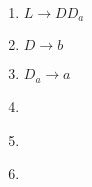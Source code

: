 \begin{tcolorbox}[colback=yellow!15!white, colframe=blue!50!white,
	fonttitle=\bfseries\Large, title = Μετατροπή $CFG\rightarrow CNF$ 2/3]
\begin{itemize}
\begin{minipage}[t]{0.5\textwidth}
\begin{enumerate}
				\reducevspace
				\item $L\rightarrow DD_a$
				\reducevspace
				\item $D\rightarrow b$
				\reducevspace
				\item $D_a\rightarrow a$
				\reducevspace
				\item \textcolor{blue}{}
				\reducevspace
				\item \textcolor{blue}{}
				\reducevspace
				\item \textcolor{blue}{}
			\end{enumerate}
		\end{minipage}

	\end{itemize}

\end{tcolorbox}

